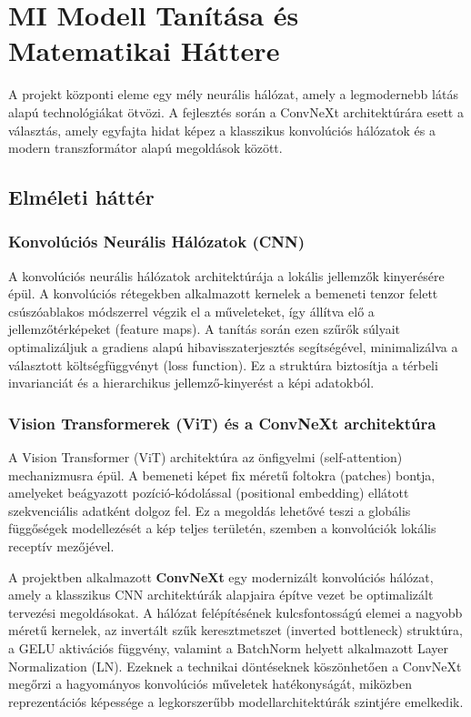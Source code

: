 \documentclass[
	parspace, %
]{elteikthesis}[2024/04/26]
\begin{document}
\chapter{MI Modell Tanítása és Matematikai Háttere}
\label{sec:mi-training}
A projekt központi eleme egy mély neurális hálózat, amely a legmodernebb látás alapú technológiákat ötvözi. A fejlesztés során a ConvNeXt architektúrára esett a választás, amely egyfajta hidat képez a klasszikus konvolúciós hálózatok és a modern transzformátor alapú megoldások között.

\section{Elméleti háttér}

\subsection{Konvolúciós Neurális Hálózatok (CNN)}
A konvolúciós neurális hálózatok architektúrája a lokális jellemzők kinyerésére épül. A konvolúciós rétegekben alkalmazott kernelek a bemeneti tenzor felett csúszóablakos módszerrel végzik el a műveleteket, így állítva elő a jellemzőtérképeket (feature maps). A tanítás során ezen szűrők súlyait optimalizáljuk a gradiens alapú hibavisszaterjesztés segítségével, minimalizálva a választott költségfüggvényt (loss function). Ez a struktúra biztosítja a térbeli invarianciát és a hierarchikus jellemző-kinyerést a képi adatokból.

\subsection{Vision Transformerek (ViT) és a ConvNeXt architektúra}
A Vision Transformer (ViT) architektúra az önfigyelmi (self-attention) mechanizmusra épül. A bemeneti képet fix méretű foltokra (patches) bontja, amelyeket beágyazott pozíció-kódolással (positional embedding) ellátott szekvenciális adatként dolgoz fel. Ez a megoldás lehetővé teszi a globális függőségek modellezését a kép teljes területén, szemben a konvolúciók lokális receptív mezőjével.

A projektben alkalmazott \textbf{ConvNeXt} egy modernizált konvolúciós hálózat, amely a klasszikus CNN architektúrák alapjaira építve vezet be optimalizált tervezési megoldásokat. A hálózat felépítésének kulcsfontosságú elemei a nagyobb méretű kernelek, az invertált szűk keresztmetszet (inverted bottleneck) struktúra, a GELU aktivációs függvény, valamint a BatchNorm helyett alkalmazott Layer Normalization (LN). Ezeknek a technikai döntéseknek köszönhetően a ConvNeXt megőrzi a hagyományos konvolúciós műveletek hatékonyságát, miközben reprezentációs képessége a legkorszerűbb modellarchitektúrák szintjére emelkedik.
\end{document}
